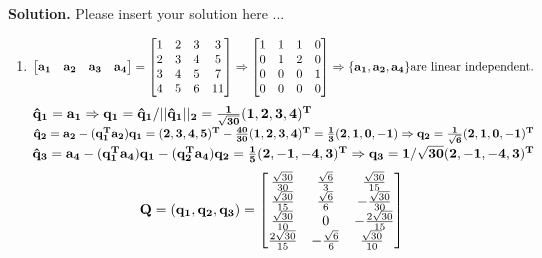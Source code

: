 \documentclass[english,onecolumn]{IEEEtran}
\begin{document}
\noindent
\textbf{Solution.}
Please insert your solution here ...
\begin{enumerate}
    \item
    $$
    \begin{bmatrix}
    \bf{a_1} & \bf{a_2} & \bf{a_3} & \bf{a_4} \\ 
    \end{bmatrix}   = 
    \begin{bmatrix}
    1 & 2 & 3 & 3\\
    2 & 3 & 4 & 5\\
    3 & 4 & 5 & 7\\
    4 & 5 & 6 & 11
    \end{bmatrix}
    \Rightarrow
    \begin{bmatrix}
    1 & 1 & 1 & 0\\
    0 & 1 & 2 & 0\\
    0 & 0 & 0 & 1\\
    0 & 0 & 0 & 0
    \end{bmatrix}
    \Rightarrow
    \{\bf{a_1,a_2,a_4} \} \text{are linear independent.}
    $$
    $\bf{\hat{q}_1} = \bf{a_1} \Rightarrow \bf{q_1} = \bf{\hat{q}_1 / ||\hat{q}_1 ||_2} = \frac{1}{\sqrt{30}} (1,2,3,4)^T$\\
    $\bf{\hat{q}_2} = \bf{a_2} - (\bf{q^T_1 a_2})q_1 = (2,3,4,5)^T- \frac{40}{30} (1,2,3,4)^T =\frac{1}{3} (2,1,0,-1) \Rightarrow \bf{q_2} =\frac{1}{\sqrt{6}} (2,1,0,-1)^T$\\
    $\bf{\hat{q}_3} = \bf{a_4} - (\bf{q^T_1 a_4})q_1 -(\bf{q^T_2 a_4})q_2=\frac{1}{5}(2,-1,-4,3)^T\Rightarrow  \bf{q_3} = 1/\sqrt{30} (2,-1,-4,3)^T$\\
    $$
    \bf{Q} = (\bf{q_1,q_2,q_3}) = 
    \begin{bmatrix}
    \frac{\sqrt{30}}{30} & \frac{\sqrt{6}}{3} & \frac{\sqrt{30}}{15}\\
    \frac{\sqrt{30}}{15} & \frac{\sqrt{6}}{6} & -\frac{\sqrt{30}}{30}\\
    \frac{\sqrt{30}}{10} & 0 & -\frac{2\sqrt{30}}{15}\\
    \frac{2\sqrt{30}}{15} & -\frac{\sqrt{6}}{6} & \frac{\sqrt{30}}{10}\
    \end{bmatrix}
    $$\\
    

\end{enumerate}
\end{document}
